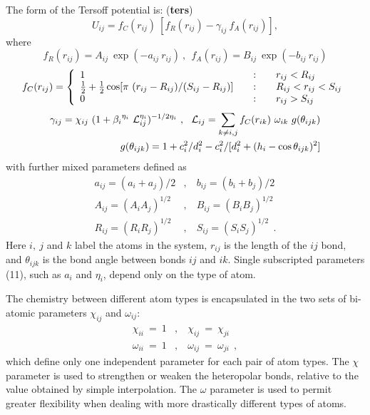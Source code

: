 The form of the Tersoff potential is:  ({\bf ters})
\begin{equation}
U_{ij} = f_{C}(r_{ij})~[f_{R}(r_{ij}) - \gamma_{ij}~f_{A}(r_{ij})],
\end{equation}
where
\begin{equation}
f_{R}(r_{ij}) = A_{ij}~\exp(- a_{ij}~r_{ij})~,~~
f_{A}(r_{ij}) = B_{ij}~\exp(- b_{ij}~r_{ij})
\end{equation}
\begin{equation}
f_{C}(r_{ij}) = \left\{ \begin{array} {l@{\qquad:\qquad}l}
1 & r_{ij} < R_{ij} \\
\frac{1}{2} + \frac{1}{2} \cos [\pi~(r_{ij}-R_{ij})/(S_{ij}-R_{ij})] & R_{ij} < r_{ij} < S_{ij} \\
0 & r_{ij} > S_{ij}
\end{array} \right.
\end{equation}
\begin{eqnarray}
\gamma_{ij} = \chi_{ij}~(1 + {\beta_{i}}^{\eta_{i}}~{\cal{L}}_{ij}^{\eta_{i}})^{-1/2\eta_{i}}~,~~
{\cal{L}}_{ij} = \sum_{k \neq i,j} f_{C}(r_{ik})~\omega_{ik}~g(\theta_{ijk}) \nonumber \\
g(\theta_{ijk}) = 1 + c_{i}^2/d_{i}^2 - c_{i}^2/[d_{i}^2 + (h_{i} - \cos\theta_{ijk})^2]
\end{eqnarray}
with further mixed parameters defined as
\begin{eqnarray}
a_{ij} = (a_{i} + a_{j})/2&,&~b_{ij} = (b_{i} + b_{j})/2 \nonumber \\
A_{ij} = (A_{i} A_{j})^{1/2}&,&~B_{ij} = (B_{i} B_{j})^{1/2} \\
R_{ij} = (R_{i} R_{j})^{1/2}&,&~S_{ij} = (S_{i} S_{j})^{1/2}~~.
\nonumber
\end{eqnarray}
Here $i,~j$ and $k$ label the atoms in the system, $r_{ij}$ is the
length of the $ij$ bond, and $\theta_{ijk}$ is the bond angle between
bonds $ij$ and $ik$.  Single subscripted parameters (11), such as
$a_{i}$ and $\eta_{i}$, depend only on the type of atom.

The chemistry between different atom types is encapsulated in the two
sets of bi-atomic parameters $\chi_{ij}$ and $\omega_{ij}$:
\begin{eqnarray}
\chi_{ii}~=~1&,&~\chi_{ij}~=~\chi_{ji} \nonumber \\
\omega_{ii}~=~1&,&~\omega_{ij}~=~\omega_{ji}~~,
\end{eqnarray}
which define only one independent parameter for each pair of atom
types.  The $\chi$ parameter is used to strengthen or weaken the
heteropolar bonds, relative to the value obtained by simple
interpolation.  The $\omega$ parameter is used to permit greater
flexibility when dealing with more drastically different types of
atoms.

